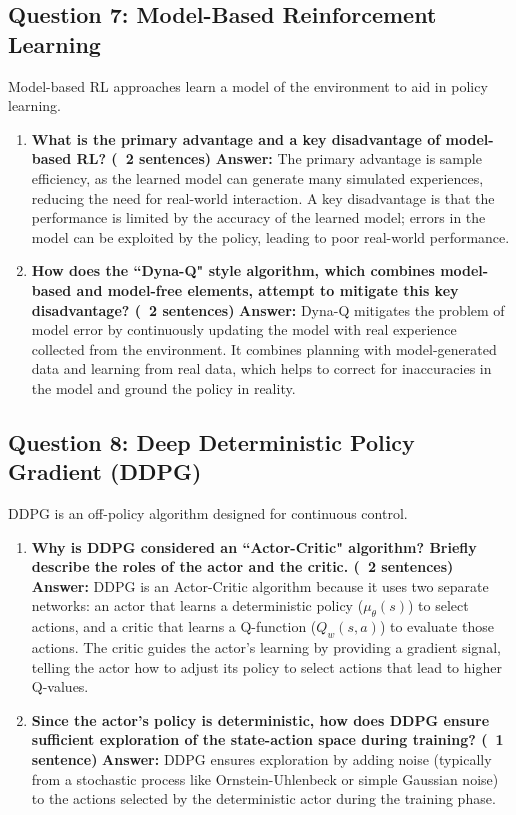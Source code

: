 \documentclass[12pt]{article}
\begin{document}
\subsection{Question 7: Model-Based Reinforcement Learning}
Model-based RL approaches learn a model of the environment to aid in policy learning.
\begin{enumerate}
    \item \textbf{What is the primary advantage and a key disadvantage of model-based RL? (~2 sentences)}
    \textbf{Answer:} The primary advantage is sample efficiency, as the learned model can generate many simulated experiences, reducing the need for real-world interaction. A key disadvantage is that the performance is limited by the accuracy of the learned model; errors in the model can be exploited by the policy, leading to poor real-world performance.
    \item \textbf{How does the ``Dyna-Q" style algorithm, which combines model-based and model-free elements, attempt to mitigate this key disadvantage? (~2 sentences)}
    \textbf{Answer:} Dyna-Q mitigates the problem of model error by continuously updating the model with real experience collected from the environment. It combines planning with model-generated data and learning from real data, which helps to correct for inaccuracies in the model and ground the policy in reality.
\end{enumerate}

\subsection{Question 8: Deep Deterministic Policy Gradient (DDPG)}
DDPG is an off-policy algorithm designed for continuous control.
\begin{enumerate}
    \item \textbf{Why is DDPG considered an ``Actor-Critic" algorithm? Briefly describe the roles of the actor and the critic. (~2 sentences)}
    \textbf{Answer:} DDPG is an Actor-Critic algorithm because it uses two separate networks: an actor that learns a deterministic policy ($\mu_\theta(s)$) to select actions, and a critic that learns a Q-function ($Q_w(s,a)$) to evaluate those actions. The critic guides the actor's learning by providing a gradient signal, telling the actor how to adjust its policy to select actions that lead to higher Q-values.
    \item \textbf{Since the actor's policy is deterministic, how does DDPG ensure sufficient exploration of the state-action space during training? (~1 sentence)}
    \textbf{Answer:} DDPG ensures exploration by adding noise (typically from a stochastic process like Ornstein-Uhlenbeck or simple Gaussian noise) to the actions selected by the deterministic actor during the training phase.
\end{enumerate}
\end{document}
